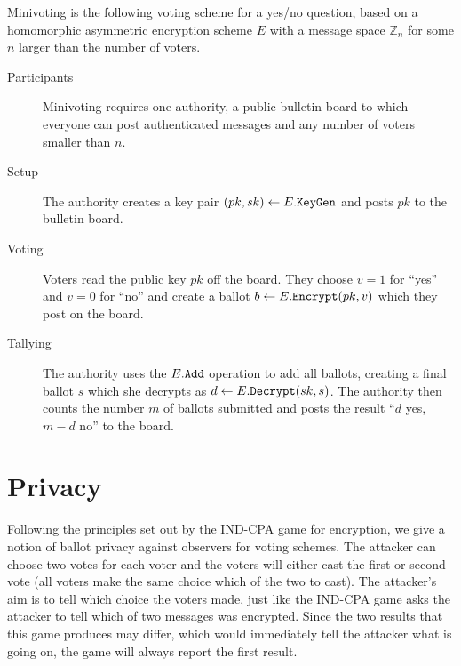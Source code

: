 \documentclass{llncs}
\newcommand{\alg}[1]{\textup{\texttt{#1}}}
\begin{document}
\begin{definition}
Minivoting is the following voting scheme for a yes/no question, based on a
homomorphic asymmetric encryption scheme $E$ with a message space $\mathbb Z_n$
for some $n$ larger than the number of voters.
\begin{description}
\item[Participants] Minivoting requires one authority, a public bulletin board
to which everyone can post authenticated messages and any number of voters
smaller than $n$.
\item[Setup]
The authority creates a key pair $(pk, sk) \gets E.\alg{KeyGen}$ and posts $pk$
to the bulletin board.
\item[Voting] Voters read the public key $pk$ off the board. They choose $v = 1$
for ``yes'' and $v = 0$ for ``no'' and create a ballot $b \gets
E.\alg{Encrypt}(pk, v)$ which they post on the board.
\item[Tallying] The authority uses the $E.\alg{Add}$ operation to add all
ballots, creating a final ballot $s$ which she decrypts as $d \gets E.\alg{Decrypt}
(sk, s)$. The authority then counts the number $m$ of ballots submitted and
posts the result ``$d$ yes, $m-d$ no'' to the board.
\end{description}
\end{definition}

\section{Privacy}

Following the principles set out by the IND-CPA game for encryption, we give a
notion of ballot privacy against observers for voting schemes. The attacker can
choose two votes for each voter and the voters will either cast the first or
second vote (all voters make the same choice which of the two to cast). The
attacker's aim is to tell which choice the voters made, just like the IND-CPA
game asks the attacker to tell which of two messages was encrypted. Since the
two results that this game produces may differ, which would immediately tell the
attacker what is going on, the game will always report the first result.
\end{document}
